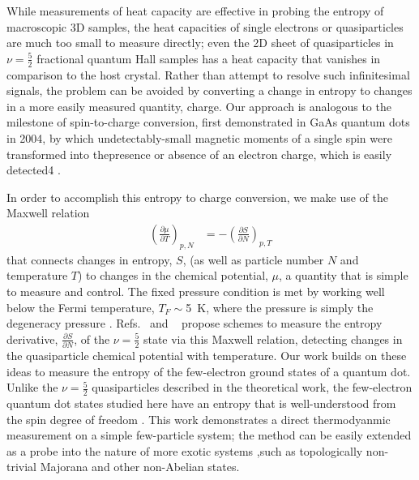 \documentclass[twocolumn,showpacs,preprintnumbers,amsmath,amssymb,pra,aps,superscriptaddress]{revtex4-1}
\begin{document}
While measurements of heat capacity are effective in probing the entropy of macroscopic 3D samples, the heat capacities of single electrons or quasiparticles are much too small to measure directly; even the 2D sheet of quasiparticles in $\nu = \frac{5}{2}$ fractional quantum Hall samples has a heat capacity that vanishes in comparison to the host crystal.  Rather than attempt to resolve such infinitesimal signals, the problem can be avoided by converting a change in entropy to changes in a more easily measured quantity, charge.  Our approach is analogous to the milestone of spin-to-charge conversion, first demonstrated in GaAs quantum dots in 2004, by which undetectably-small magnetic moments of a single spin were transformed into thepresence or absence of an electron charge, which is easily detected4 \cite{Elzerman2004, Ono2004}.

In order to accomplish this entropy to charge conversion, we make use of the Maxwell relation
%
\begin{align}
\label{eqn:max}
        \left(\frac{\partial \mu}{\partial T}\right)_{p,N} &= -\left(\frac{\partial S}{\partial N}\right)_{p,T}
\end{align}
%
that connects changes in entropy, $S$, (as well as particle number $N$ and temperature $T$) to changes in the chemical potential, $\mu$, a quantity that is simple to measure and control. The fixed pressure condition is met by working well below the Fermi temperature, $T_F \sim$\SI{5}{\kelvin}, where the pressure is simply the degeneracy pressure \cite{Landau1969}. Refs.~ and ~ propose schemes to measure the entropy derivative, $\frac{\partial S}{\partial N}$, of the $\nu = \frac{5}{2}$ state via this Maxwell relation, detecting changes in the quasiparticle chemical potential with temperature.  Our work builds on these ideas to measure the entropy of the few-electron ground states of a quantum dot. Unlike the $\nu = \frac{5}{2}$ quasiparticles described in the theoretical work, the few-electron quantum dot states studied here have an entropy that is well-understood from the spin degree of freedom \cite{Tarucha1996, Ciorga2000, Duncan2000, Lindemann2002, Potok2003, Hofmann2016}. This work demonstrates a direct thermodyanmic measurement on a simple few-particle system; the method can be easily extended as a probe into the nature of more exotic systems ,such as topologically non-trivial Majorana and other non-Abelian states.
\end{document}
